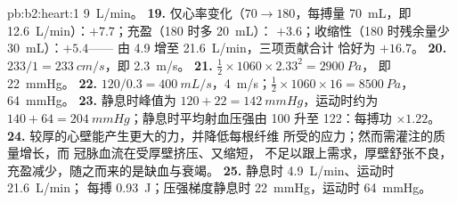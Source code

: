 \begin{solution}{pb:b2:heart:1}
 \qty{9}{L/min}。
\textbf{19.} 仅心率变化（$70 \to 180$，每搏量 \qty{70}{mL}，即
\qty{12.6}{L/min}）：$+7.7$；充盈（180 时多 \qty{20}{mL}）：
$+3.6$；收缩性（180 时残余量少 \qty{30}{mL}）：$+5.4$——
由 4.9 增至 \qty{21.6}{L/min}，三项贡献合计
恰好为 $+16.7$。
\textbf{20.} $233/1 = \qty{233}{cm/s}$，即 \qty{2.3}{m/s}。
\textbf{21.} $\tfrac12\times 1060\times 2.33^{2} = \qty{2900}{Pa}$，
即 \qty{22}{mmHg}。
\textbf{22.} $120/0.3 = \qty{400}{mL/s}$，\qty{4}{m/s}；$\tfrac12\times
1060\times 16 = \qty{8500}{Pa}$，\qty{64}{mmHg}。
\textbf{23.} 静息时峰值为 $120 + 22 = \qty{142}{mmHg}$，运动时约为 $140 +
64 = \qty{204}{mmHg}$；静息时平均射血压强由 100 升至 122：每搏功
$\times 1.22$。
\textbf{24.} 较厚的心壁能产生更大的力，并降低每根纤维
所受的应力；然而需灌注的质量增长，而
冠脉血流在受厚壁挤压、又缩短，
不足以跟上需求，厚壁舒张不良，
充盈减少，随之而来的是缺血与衰竭。
\textbf{25.} 静息时 \qty{4.9}{L/min}、运动时 \qty{21.6}{L/min}；
每搏 \qty{0.93}{J}；压强梯度静息时 \qty{22}{mmHg}，运动时
\qty{64}{mmHg}。
\end{solution}
